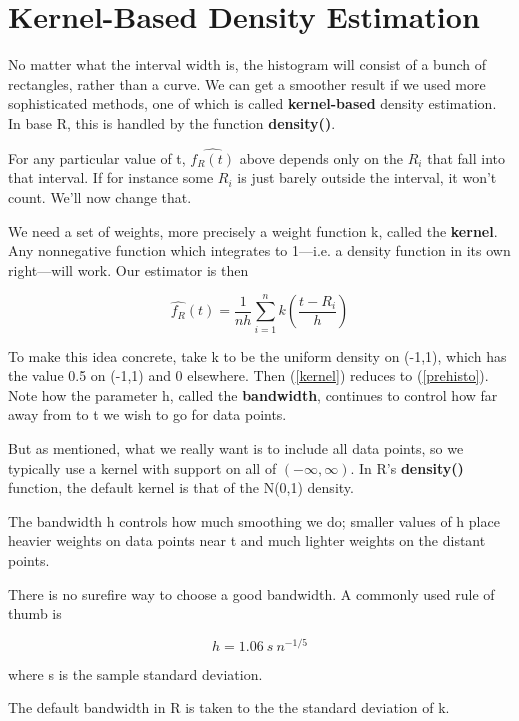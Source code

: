 \section{Kernel-Based Density Estimation}

No matter what the interval width is, the histogram will consist of a
bunch of rectangles, rather than a curve.  We can get a smoother result
if we used more sophisticated methods, one of which is called {\bf
kernel-based} density estimation.  In base R, this is handled by the
function {\bf density()}.  

For any particular value of t, $\widehat{f_R(t)}$ above depends only on the
$R_i$ that fall into that interval.  If for instance some $R_i$ is just
barely outside the interval, it won't count.  We'll now change that.  

We need a set of weights, more precisely a weight function k, called the
{\bf kernel}.  Any nonnegative function which integrates to 1---i.e. a
density function in its own right---will work.  Our estimator is then

\begin{equation}
\label{kernel}
\widehat{f_R}(t) = \frac{1}{nh} \sum_{i=1}^{n} k \left ( \frac{t-R_i}{h} \right )
\end{equation}

To make this idea concrete, take k to be the uniform density on (-1,1),
which has the value 0.5 on (-1,1) and 0 elsewhere.  Then (\ref{kernel})
reduces to (\ref{prehisto}).  Note how the parameter h, called the {\bf
bandwidth}, continues to control how far away from to t we wish to go
for data points.

But as mentioned, what we really want is to include all data points, so
we typically use a kernel with support on all of $(-\infty, \infty)$.
In R's {\bf density()} function, the default kernel is that of the N(0,1) 
density.  

The bandwidth h controls how much smoothing we do; smaller values of h
place heavier weights on data points near t and much lighter weights on
the distant points.  

There is no surefire way to choose a good bandwidth.  A commonly used
rule of thumb is

\begin{equation}
h = 1.06 ~ s ~ n^{-1/5}
\end{equation}

where s is the sample standard deviation.

The default bandwidth in R is taken to the the standard
deviation of k.

